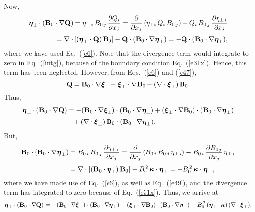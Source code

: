 \documentclass[12pt,prb,aps,notitlepage]{revtex4-1}
\newcommand{\bxi}{\mbox{\boldmath$\xi$}}
\newcommand{\bta}{\mbox{\boldmath$\eta$}}
\newcommand{\bkappa}{\mbox{\boldmath$\kappa$}}
\begin{document}
Now,
\begin{align}
\bta_\perp\cdot({\bf B}_0\cdot\nabla{\bf Q}) 
= \eta_{\perp\,i}\,B_{0\,j}\,\frac{\partial Q_i}{\partial x_j}=
\frac{\partial}{\partial x_j}\,(\eta_{\perp i}\,Q_i\,B_{0\,j})
- Q_i\,B_{0\,j}\,\frac{\partial\eta_{\perp\,i}}{\partial x_j}\nonumber\\[0.5ex]
= \nabla\cdot[(\bta_\perp\cdot {\bf Q})\,{\bf B}_0] - {\bf Q}\cdot ({\bf B}_0\cdot\nabla \bta_\perp)=- {\bf Q}\cdot ({\bf B}_0\cdot\nabla \bta_\perp),
\end{align}
where we have  used Eq.~(\ref{e6}). Note that the divergence term would integrate to zero in Eq.~(\ref{intg}),  because of the boundary condition Eq.~(\ref{e31x}). 
Hence, this term has been neglected. 
However, from Eqs.~(\ref{e6}) and (\ref{e47}),
\begin{equation}\label{e53}
{\bf Q}  ={\bf B}_0\cdot\nabla \bxi_\perp - \bxi_\perp\cdot\nabla {\bf B}_0 - (\nabla\cdot\bxi_\perp)\,{\bf B}_0.
\end{equation}
Thus,
\begin{align}
\bta_\perp \cdot({\bf B}_0\cdot\nabla {\bf Q})&=- ({\bf B}_0\cdot\nabla\bxi_\perp)\cdot({\bf B}_0\cdot\nabla \bta_\perp)+ (\bxi_\perp\cdot\nabla {\bf B}_0)\cdot({\bf B}_0\cdot\nabla \bta_\perp) \nonumber\\[0.5ex]
&\phantom{=}+ (\nabla\cdot\bxi_\perp)\,{\bf B}_0\cdot({\bf B}_0\cdot\nabla \bta_\perp). 
\end{align}
But,
\begin{align}
{\bf B}_0\cdot({\bf B}_0\cdot\nabla \bta_\perp)&= B_{0\,i}\,B_{0\,j}\,\frac{\partial \eta_{\perp\,i}}{\partial x_j}= \frac{\partial}{\partial x_j}\,( B_{0\,i}\,B_{0\,j}\, \eta_{\perp\,i}) - B_{0\,i}\,\frac{\partial B_{0\,j}}{\partial x_j}\,\eta_{\perp\,i}\nonumber\\[0.5ex]
&= \nabla\cdot [({\bf B}_0\cdot\bta_\perp)\,{\bf B}_0] -B_0^{\,2}\,\bkappa\cdot \bta_\perp=-B_0^{\,2}\,\bkappa\cdot \bta_\perp,
\end{align}
where we have made use of Eq.~(\ref{e6}), as well as Eq.~(\ref{e49}), and the divergence term has integrated to zero because of Eq.~(\ref{e31x}). Thus, we arrive at
\begin{equation}\label{e56}
\bta_\perp \cdot({\bf B}_0\cdot\nabla {\bf Q})=- ({\bf B}_0\cdot\nabla\bxi_\perp)\cdot({\bf B}_0\cdot\nabla \bta_\perp)+ (\bxi_\perp\cdot\nabla {\bf B}_0)\cdot({\bf B}_0\cdot\nabla \bta_\perp) - B_0^{\,2}\,(\bta_\perp\cdot\bkappa)\,(\nabla\cdot\bxi_\perp).
\end{equation}
\end{document}
